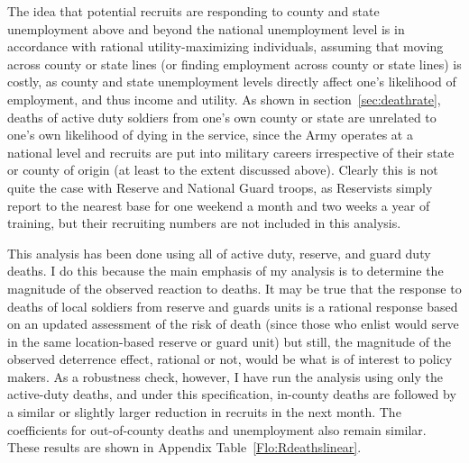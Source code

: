 \documentclass[12pt] {article}
\begin{document}


The idea that potential recruits are responding to county and state
unemployment above and beyond the national unemployment level is in
accordance with rational utility-maximizing individuals, assuming
that moving across county or state lines (or finding employment across
county or state lines) is costly, as county and state unemployment
levels directly affect one's likelihood of employment, and thus income
and utility. As shown in section~\ref{sec:deathrate}, deaths of active duty soldiers from one's own county
or state are unrelated to one's own likelihood of dying in the service,
since the Army operates at a national level and recruits are put into
military careers irrespective of their state or county of origin (at
least to the extent discussed above). Clearly this is not quite the
case with Reserve and National Guard troops, as Reservists simply
report to the nearest base for one weekend a month and two weeks
a year of training, but their recruiting numbers are not included
in this analysis.


This analysis has been done using all of active duty, reserve, and
guard duty deaths. I do this because the main emphasis of my analysis
is to determine the magnitude of the observed reaction to deaths.
It may be true that the response to deaths of local soldiers from
reserve and guards units is a rational response based on an updated
assessment of the risk of death (since those who enlist would serve in the same location-based reserve or guard unit) but still, the magnitude of the observed
deterrence effect, rational or not, would be what is of interest to
policy makers. As a robustness check, however, I have run the analysis
using only the active-duty deaths, and under this specification, in-county
deaths are followed by a similar or slightly larger reduction in recruits in the
next month. The coefficients for out-of-county deaths and unemployment also
remain similar. These results are shown in Appendix Table~\ref{Flo:Rdeathslinear}. 
\end{document}
